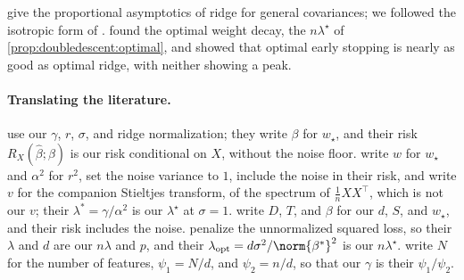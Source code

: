 \begin{refsection}
\Textcite{DobribanWager2018} give the proportional asymptotics of ridge for general covariances; we followed the isotropic form of \textcite{HastieEtAl2022}. \Textcite{KroghHertz1992} found the optimal weight decay, the $n\lambda^\star$ of \cref{prop:doubledescent:optimal}, and \textcite{AdvaniEtAl2020} showed that optimal early stopping is nearly as good as optimal ridge, with neither showing a peak.

\paragraph{Translating the literature.} \Textcite{HastieEtAl2022} use our $\gamma$, $r$, $\sigma$, and ridge normalization; they write $\beta$ for $w_\star$, and their risk $R_X(\hat\beta;\beta)$ is our risk conditional on $X$, without the noise floor. \Textcite{DobribanWager2018} write $w$ for $w_\star$ and $\alpha^2$ for $r^2$, set the noise variance to $1$, include the noise in their risk, and write $v$ for the companion Stieltjes transform, of the spectrum of $\frac1nXX^\top$, which is not our $v$; their $\lambda^*=\gamma/\alpha^2$ is our $\lambda^\star$ at $\sigma=1$. \Textcite{BelkinEtAl2020} write $D$, $T$, and $\beta$ for our $d$, $S$, and $w_\star$, and their risk includes the noise. \Textcite{NakkiranEtAl2021} penalize the unnormalized squared loss, so their $\lambda$ and $d$ are our $n\lambda$ and $p$, and their $\lambda_{\mathrm{opt}}=d\sigma^2/\norm{\beta^*}^2$ is our $n\lambda^\star$. \Textcite{MeiMontanari2022} write $N$ for the number of features, $\psi_1=N/d$, and $\psi_2=n/d$, so that our $\gamma$ is their $\psi_1/\psi_2$.

\printchapterbib
\end{refsection}
